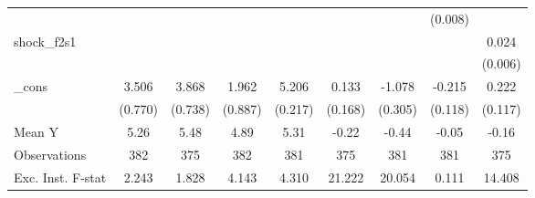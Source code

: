 {\begin{tabular}{l*{8}{c}}
            &                     &                     &                     &                     &                     &                     &     (0.008)         &                     \\
\addlinespace
shock\_f2s1  &                     &                     &                     &                     &                     &                     &                     &       0.024\sym{***}\\
            &                     &                     &                     &                     &                     &                     &                     &     (0.006)         \\
\addlinespace
\_cons      &       3.506\sym{***}&       3.868\sym{***}&       1.962\sym{**} &       5.206\sym{***}&       0.133         &      -1.078\sym{***}&      -0.215\sym{*}  &       0.222\sym{*}  \\
            &     (0.770)         &     (0.738)         &     (0.887)         &     (0.217)         &     (0.168)         &     (0.305)         &     (0.118)         &     (0.117)         \\
\midrule
Mean Y      &        5.26         &        5.48         &        4.89         &        5.31         &       -0.22         &       -0.44         &       -0.05         &       -0.16         \\
Observations&         382         &         375         &         382         &         381         &         375         &         381         &         381         &         375         \\
Exc. Inst. F-stat&       2.243         &       1.828         &       4.143         &       4.310         &      21.222         &      20.054         &       0.111         &      14.408         \\
\bottomrule
\end{tabular}
}
